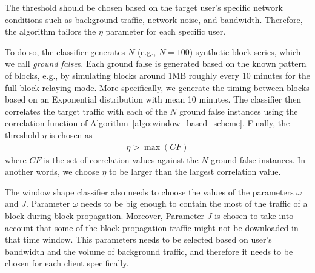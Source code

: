  The threshold should be chosen based on the target user's specific network conditions such as background traffic, network noise, and bandwidth. Therefore, the algorithm tailors the $\eta$ parameter for each specific user. 


To do so, the classifier generates $N$ (e.g., $N=100$) synthetic block series, which we call \emph{ground false}s. 
Each ground false is generated based on the known pattern of \bc blocks, e.g., by simulating blocks around 1MB roughly every 10 minutes for the full block relaying mode. More specifically, we generate the timing between blocks based on an Exponential distribution with mean 10 minutes.
%
The classifier then correlates the target traffic with each of the $N$ ground false instances using the correlation function of Algorithm~\ref{algo:window_based_scheme}. Finally, the threshold $\eta$ is chosen as 
\begin{align}\label{gt_gf}
\eta > \max(CF) 
\end{align}
where $CF$ is the set of correlation values against the $N$ ground false instances. In another words, we choose $\eta$ to be larger than the largest correlation value.

 The window shape classifier also needs to choose the values of the parameters $\omega$ and $J$. Parameter $\omega$ needs to be big enough to contain the most of the traffic of a block during block propagation. Moreover, Parameter $J$ is chosen to take into account that some  of the block propagation traffic might not be downloaded in that time window. This parameters needs to be selected based on user's bandwidth and the volume of background traffic, and therefore it needs to be chosen for each client specifically. 



\iffalse The window size parameter \textbf{\textit{$\omega$}} represents the delay for a client to fully receive a specific block. Therefore, it should be based on two features: propagation delay and download time. The propagation delay is usually smaller than the download time so we ignore it in choosing \textit{$\omega$}. 
We estimate a target client's block downloading time as $\frac{block\ size}{client's\ bandwidth}$.The parameter $J$ represents natural network jitter for the target client. To derive $J$ for each user, we derive the difference of traffic volume in the user's consecutive time windows, excluding the windows that arrive close to the times of blocks (note that we do not know if this is a \bc client or not). In other words, we measure $\Delta V$'s for windows that do not collide with block times.  
 $J$ is the standard deviation of such difference values.\fi

